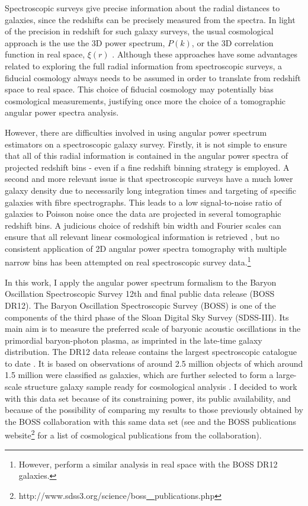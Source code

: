 \qquad Spectroscopic surveys give precise information about the radial distances to galaxies, since the redshifts can be precisely measured from the spectra. In light of the precision in redshift for such galaxy surveys, the usual cosmological approach is the use the 3D power spectrum, $P(k)$, or the 3D correlation function in real space, $\xi(r)$ \citep{2001Percival,2017RossBOSS,2017BeutlerBOSS,2017WangBOSS}. Although these approaches have some advantages related to exploring the full radial information from spectroscopic surveys, a fiducial cosmology always needs to be assumed in order to translate from redshift space to real space. This choice of fiducial cosmology may potentially bias cosmological measurements, justifying once more the choice of a tomographic angular power spectra analysis.

\qquad However, there are difficulties involved in using angular power spectrum estimators on a spectroscopic galaxy survey. Firstly, it is not simple to ensure that all of this radial information is contained in the angular power spectra of projected redshift bins - even if a fine redshift binning strategy is employed. A second and more relevant issue is that spectroscopic surveys have a much lower galaxy density due to necessarily long integration times and targeting of specific galaxies with fibre spectrographs. This leads to a low signal-to-noise ratio of galaxies to Poisson noise once the data are projected in several tomographic redshift bins. A judicious choice of redshift bin width and Fourier scales can ensure that all relevant linear cosmological information is retrieved \citep{Asorey2012, Gaztanaga2012, Eriksen2015, Kirk2015}, but no consistent application of 2D angular power spectra tomography with multiple narrow bins has been attempted on real spectroscopic survey data.\footnote{However, \citet{2017SalazarBOSSwTheta} perform a similar analysis in real space with the BOSS DR12 galaxies.}

\qquad In this work, I apply the angular power spectrum formalism to the Baryon Oscillation Spectroscopic Survey 12th and final public data release (BOSS DR12). The Baryon Oscillation Spectroscopic Survey (BOSS) is one of the components of the third phase of the Sloan Digital Sky Survey (SDSS-III). Its main aim is to measure the preferred scale of baryonic acoustic oscillations in the primordial baryon-photon plasma, as imprinted in the late-time galaxy distribution. The DR12 data release contains the largest spectroscopic catalogue to date \citep{BOSS2015}. It is based on observations of around 2.5 million objects of which around 1.5 million were classified as galaxies, which are further selected to form a large-scale structure galaxy sample ready for cosmological analysis \citep{BOSSCatalogue2016}. I decided to work with this data set because of its constraining power, its public availability, and because of the possibility of comparing my results to those previously obtained by the BOSS collaboration with this same data set (see \citealt{2016BOSSCosmology} and the BOSS publications website\footnote{http://www.sdss3.org/science/boss\underline{~~}publications.php} for a list of cosmological publications from the collaboration).

